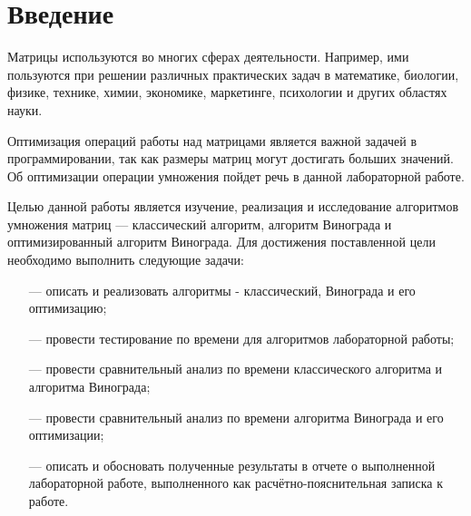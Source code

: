 \chapter*{Введение}

Матрицы используются во многих сферах деятельности. Например, ими пользуются при решении различных практических задач в математике, биологии, физике, технике, химии, экономике, маркетинге, психологии и других областях науки. 

Оптимизация операций работы над матрицами является важной задачей в программировании, так как размеры матриц могут достигать больших значений. Об оптимизации операции умножения пойдет речь в данной лабораторной работе.


Целью данной работы является изучение, реализация и исследование алгоритмов умножения матриц --- классический алгоритм, алгоритм Винограда и оптимизированный алгоритм Винограда. 
Для достижения поставленной цели необходимо выполнить следующие задачи:
\begin{itemize}
	\item[---] описать и реализовать алгоритмы - классический, Винограда и его оптимизацию;
    \item[---] провести тестирование по времени для алгоритмов лабораторной работы;
    \item[---] провести сравнительный анализ по времени классического алгоритма и алгоритма Винограда;
    \item[---] провести сравнительный анализ по времени алгоритма Винограда и его оптимизации;
	\item[---] описать и обосновать полученные результаты в отчете о выполненной лабораторной работе, выполненного как расчётно-пояснительная записка к работе.
\end{itemize}
